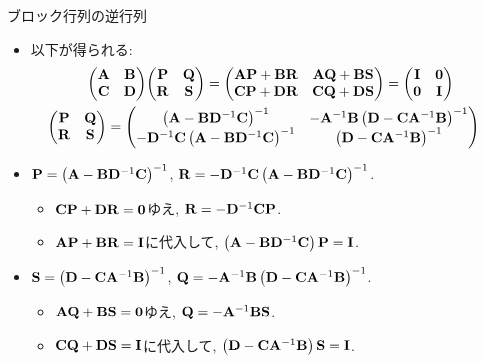 \documentclass[dvipdfmx,notheorems,t]{beamer}
\begin{document}
\begin{frame}{ブロック行列の逆行列}
\begin{itemize}
  \item 以下が得られる:
  \begin{gather*}
    \mqty(\vb{A} & \vb{B} \\ \vb{C} & \vb{D}) \mqty(\vb{P} & \vb{Q} \\ \vb{R} & \vb{S})
      = \mqty(\vb{A} \vb{P} + \vb{B} \vb{R} & \vb{A} \vb{Q} + \vb{B} \vb{S} \\
        \vb{C} \vb{P} + \vb{D} \vb{R} & \vb{C} \vb{Q} + \vb{D} \vb{S})
      = \mqty(\vb{I} & \vb{0} \\ \vb{0} & \vb{I}) \\
    \hspace*{-10pt} \mqty(\vb{P} & \vb{Q} \\ \vb{R} & \vb{S})
      = \mqty(\left( \vb{A} - \vb{B} \vb{D}^{-1} \vb{C} \right)^{-1} &
        -\vb{A}^{-1} \vb{B} \left( \vb{D} - \vb{C} \vb{A}^{-1} \vb{B} \right)^{-1} \\
        -\vb{D}^{-1} \vb{C} \left( \vb{A} - \vb{B} \vb{D}^{-1} \vb{C} \right)^{-1} &
        \left( \vb{D} - \vb{C} \vb{A}^{-1} \vb{B} \right)^{-1})
  \end{gather*}
  \item $\vb{P} = \left( \vb{A} - \vb{B} \vb{D}^{-1} \vb{C} \right)^{-1}$,
  $\vb{R} = -\vb{D}^{-1} \vb{C} \left( \vb{A} - \vb{B} \vb{D}^{-1} \vb{C} \right)^{-1}$.
  \begin{itemize}
    \item $\vb{C} \vb{P} + \vb{D} \vb{R} = \vb{0}$ゆえ, $\vb{R} = -\vb{D}^{-1} \vb{C} \vb{P}$.
    \item $\vb{A} \vb{P} + \vb{B} \vb{R} = \vb{I}$に代入して,
    $\left( \vb{A} - \vb{B} \vb{D}^{-1} \vb{C} \right) \vb{P} = \vb{I}$.
  \end{itemize}

  \item $\vb{S} = \left( \vb{D} - \vb{C} \vb{A}^{-1} \vb{B} \right)^{-1}$,
  $\vb{Q} = -\vb{A}^{-1} \vb{B} \left( \vb{D} - \vb{C} \vb{A}^{-1} \vb{B} \right)^{-1}$.
  \begin{itemize}
    \item $\vb{A} \vb{Q} + \vb{B} \vb{S} = \vb{0}$ゆえ, $\vb{Q} = -\vb{A}^{-1} \vb{B} \vb{S}$.
    \item $\vb{C} \vb{Q} + \vb{D} \vb{S} = \vb{I}$に代入して,
    $\left( \vb{D} - \vb{C} \vb{A}^{-1} \vb{B} \right) \vb{S} = \vb{I}$.
  \end{itemize}
\end{itemize}
\end{frame}
\end{document}
